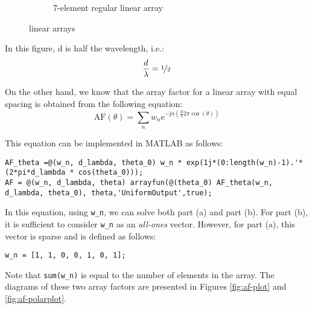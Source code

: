 \documentclass[12pt,onecolumn,a4paper]{article}
\newcounter{rownum} %
\begin{document}
\begin{figure}[h]
\begin{subfigure}{\linewidth}
\begin{adjustbox}{scale=1.2}
			\end{adjustbox}
			\caption{7-element regular linear array}
		\end{subfigure}
		\caption{linear arrays}
	\end{figure}
	
	In this figure, d is half the wavelength, i.e.:	
	\begin{equation}
		\frac{d}{\lambda} = \nicefrac12
	\end{equation}
	
	On the other hand, we know that the array factor for a linear array with equal spacing is obtained from the following equation:	
	\begin{equation}
		\mathrm{AF}(\theta) = \sum_{n} w_n \mathrm{e}^{-\mathrm{j}n(\frac{d}{\lambda}2\pi\cos(\theta))}
	\end{equation}
	
	This equation can be implemented in MATLAB as follows:
\begin{lstlisting}
AF_theta =@(w_n, d_lambda, theta_0) w_n * exp(1j*(0:length(w_n)-1).'* (2*pi*d_lambda * cos(theta_0)));
AF = @(w_n, d_lambda, theta) arrayfun(@(theta_0) AF_theta(w_n, d_lambda, theta_0), theta,'UniformOutput',true);
\end{lstlisting}
	
In this equation, using \texttt{w\_n}, we can solve both part (a) and part (b). For part (b), it is sufficient to consider \texttt{w\_n} as an \textit{all-ones} vector. However, for part (a), this vector is sparse and is defined as follows:
\begin{lstlisting}
w_n = [1, 1, 0, 0, 1, 0, 1];
\end{lstlisting}
Note that \verb|sum(w_n)| is equal to the number of elements in the array.
The diagrams of these two array factors are presented in Figures \ref{fig:af-plot} and \ref{fig:af-polarplot}.
\end{document}
